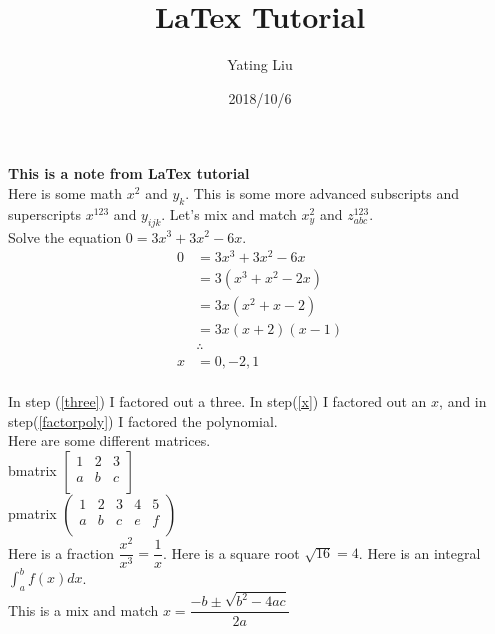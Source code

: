 \documentclass{article}
\begin{document}
\title{LaTex Tutorial}
\author{Yating Liu}
\date{2018/10/6}
\maketitle
\textbf{This is a note from LaTex tutorial}\\

Here is some math $x^2$ and $y_k$. This is some more advanced subscripts and superscripts $x^{123}$ and $y_{ijk}$. Let's mix and match $x^2_y$ and $z^{123}_{abc}$.\\

Solve the equation $0 = 3x^3+3x^2-6x$.
\begin{align}
0 &= 3x^3+3x^2-6x  \\
  &= 3(x^3+x^2-2x) \label{three} \\
  &= 3x(x^2+x-2)   \label{x} \\
  &= 3x(x+2)(x-1)  \label{factorpoly} \\
  & \therefore     \nonumber \\
x &= 0, -2, 1
\end{align}\\

In step (\ref{three}) I factored out a three. In step(\ref{x}) I factored out an $x$, and in step(\ref{factorpoly}) I factored the polynomial.\\

Here are some different matrices.\\
bmatrix
$
\begin{bmatrix}
1 & 2 & 3 \\
a & b & c \\
\end{bmatrix}
$\\
pmatrix
$
\begin{pmatrix}
1 & 2 & 3 & 4 & 5 \\
a & b & c & e & f\\
\end{pmatrix}
$\\

Here is a fraction $\dfrac{x^2}{x^3} = \dfrac{1}{x}$.
Here is a square root $\sqrt{16}=4$.
Here is an integral $\int_{a}^{b}f(x)dx$.\\
This is a mix and match $x=\dfrac{-b \pm \sqrt{b^2-4ac}}{2a}$\\
\end{document}
